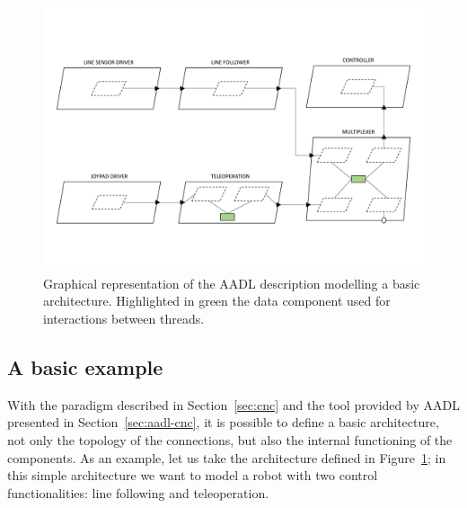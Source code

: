 \begin{landscape}
	\begin{figure}[t]
	\centering
	\includegraphics[height=0.88\textwidth]{gfx/arch_figures-25}
	\caption[Graphical representation of the AADL description modelling a basic architecture.]{Graphical representation of the AADL description modelling a basic architecture. Highlighted in green the data component used for interactions between threads.}
	\label{fig:cnc-arch}
	\end{figure}
\end{landscape}

\subsection{A basic example}
\label{sec:cnc-basic}
With the paradigm described in Section~\ref{sec:cnc} and the tool provided by AADL presented in Section~\ref{sec:aadl-cnc}, it is possible to define a basic architecture, not only the topology of the connections, but also the internal functioning of the components. As an example, let us take the architecture defined in Figure~\ref{fig:cnc-arch}; in this simple architecture we want to model a robot with two control functionalities: line following and teleoperation.

